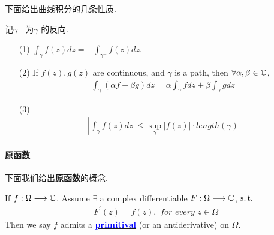\vspace{2em}
下面给出曲线积分的几条性质.
\begin{proposition}\label{prop 4.1.2}
	记$\gamma^{-}$ 为$\gamma$ 的反向.
	\begin{enumerate}
		\item[(1)]$\int_{\gamma}{f(z) dz} = -\int_{\gamma^{-}}{f(z) dz}$.
		
		\item[(2)]If $f(z) , g(z)$ are continuous, and $\gamma$ is a path, then $\forall \alpha , \beta \in \mathbb{C}$,
		\begin{align}
			\int_{\gamma}{(\alpha f + \beta g) dz} = \alpha \int_{\gamma}{f dz} + \beta \int_{\gamma}{g dz}
		\end{align}
		
		\item[(3)]
		\begin{align}
			\left| \int_{\gamma}{f(z) dz} \right| \leq \sup_{\gamma}{\left| f(z) \right|} \cdot length(\gamma)
		\end{align}
	\end{enumerate}
\end{proposition}

\newpage
\paragraph{原函数}
下面我们给出\textbf{原函数}的概念.
\begin{defn}\label{def 4.1.4}
	If $f : \Omega \longrightarrow \mathbb{C}$. Assume $\exists$ a complex differentiable $F : \Omega \longrightarrow \mathbb{C}$, $\operatorname{s.t.}$
	\begin{align}
		F^{'}(z) = f(z) , \,\, for \,\, every \,\, z \in \Omega
	\end{align}
	Then we say $f$ admits a \underline{\textcolor{blue}{\textbf{primitival}}} (or an antiderivative) on $\Omega$.
\end{defn}

